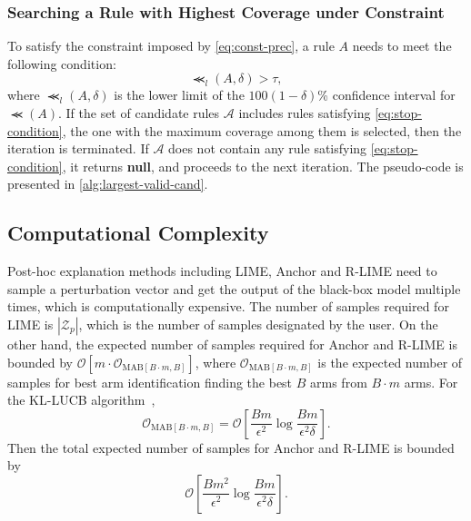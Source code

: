 \documentclass[runningheads]{llncs}
\begin{document}
{\subsubsection{Searching a Rule with Highest Coverage under Constraint}
To satisfy the constraint imposed by \cref{eq:const-prec},
a rule $A$ needs to meet the following condition:
\begin{equation}
  \Prec_{l}(A,\delta)>\tau,\label{eq:stop-condition}
\end{equation}
where $\Prec_{l}(A,\delta)$ is the lower limit of
the $100(1-\delta)$\% confidence interval for $\Prec(A)$.
If the set of candidate rules $\mathcal{A}$
includes rules satisfying \cref{eq:stop-condition},
the one with the maximum coverage among them is selected,
then the iteration is terminated.
If $\mathcal{A}$ does not contain any rule satisfying \cref{eq:stop-condition},
it returns \textbf{null},
and proceeds to the next iteration.
The pseudo-code is presented in \cref{alg:largest-valid-cand}.


\subsection{Computational Complexity}\label{subsec:complexity}
Post-hoc explanation methods including LIME, Anchor and R-LIME
need to sample a perturbation vector
and get the output of the black-box model multiple times,
which is computationally expensive.
The number of samples required for LIME is $|\mathcal{Z}_p|$,
which is the number of samples designated by the user.
On the other hand,
the expected number of samples required for Anchor and R-LIME is bounded by
$\mathcal{O}[m\cdot\mathcal{O}_{\mathrm{MAB}[B\cdot m,B]}]$,
where $\mathcal{O}_{\mathrm{MAB}[B\cdot m,B]}$
is the expected number of samples
for best arm identification finding the best $B$ arms from $B\cdot m$ arms.
For the KL-LUCB algorithm~\cite{kaufmann2013information},
\begin{equation}
  \mathcal{O}_{\mathrm{MAB}[B\cdot m,B]}=
  \mathcal{O}\left[\frac{Bm}{\epsilon^2}\log\frac{Bm}{\epsilon^2\delta}\right].
\end{equation}
Then the total expected number of samples for Anchor and R-LIME is bounded by
\begin{equation}
  \mathcal{O}\left[\frac{Bm^2}{\epsilon^2}\log\frac{Bm}{\epsilon^2\delta}\right].
\end{equation}

}
\end{document}
